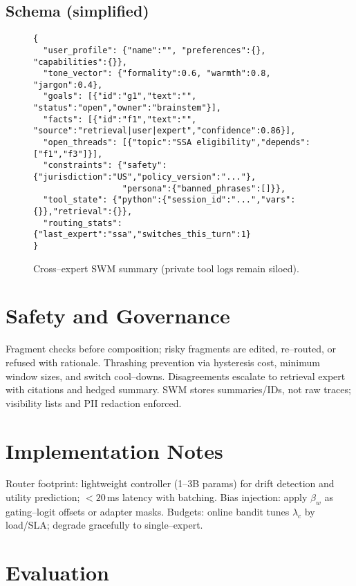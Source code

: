 \documentclass[11pt]{article}
\begin{document}
\subsection{Schema (simplified)}
\begin{figure}[h]
\centering
\begin{minipage}{0.95\linewidth}
\small
\begin{verbatim}
{
  "user_profile": {"name":"", "preferences":{}, "capabilities":{}},
  "tone_vector": {"formality":0.6, "warmth":0.8, "jargon":0.4},
  "goals": [{"id":"g1","text":"", "status":"open","owner":"brainstem"}],
  "facts": [{"id":"f1","text":"", "source":"retrieval|user|expert","confidence":0.86}],
  "open_threads": [{"topic":"SSA eligibility","depends":["f1","f3"]}],
  "constraints": {"safety":{"jurisdiction":"US","policy_version":"..."},
                  "persona":{"banned_phrases":[]}},
  "tool_state": {"python":{"session_id":"...","vars":{}},"retrieval":{}},
  "routing_stats": {"last_expert":"ssa","switches_this_turn":1}
}
\end{verbatim}
\end{minipage}
\caption{Cross--expert SWM summary (private tool logs remain siloed).}
\end{figure}

\section{Safety and Governance}
Fragment checks before composition; risky fragments are edited, re--routed, or refused with rationale. Thrashing prevention via hysteresis cost, minimum window sizes, and switch cool--downs. Disagreements escalate to retrieval expert with citations and hedged summary. SWM stores summaries/IDs, not raw traces; visibility lists and PII redaction enforced.

\section{Implementation Notes}
Router footprint: lightweight controller (1--3B params) for drift detection and utility prediction; $<\!20$\,ms latency with batching. Bias injection: apply $\beta_w$ as gating--logit offsets or adapter masks. Budgets: online bandit tunes $\lambda_c$ by load/SLA; degrade gracefully to single--expert.

\section{Evaluation}
\end{document}

